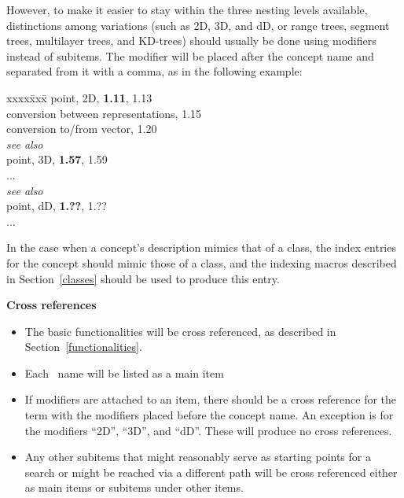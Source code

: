 \documentclass{article}
\newenvironment{indexex}{\begin{tabbing}
xxxx\=xxx\=\kill}{\end{tabbing}}
\begin{document}
\begin{description}
        However,
        to make it easier to stay within the three nesting levels available, 
        distinctions among variations (such as
        2D, 3D, and dD, or range trees, segment trees, multilayer trees, 
        and KD-trees) should usually be done using 
        modifiers instead of subitems.  The modifier will be 
        placed after the concept name and separated from it with a comma, as in 
        the following example:
        \begin{indexex}
        point, 2D,                                  {\bf 1.11}, 1.13 \\
        \>  conversion between representations,                  1.15 \\
        \>  conversion to/from vector,                           1.20\\
        \>  {\em see also}                 \\
        point, 3D,                                  {\bf 1.57}, 1.59 \\
        \> ...                                                       \\
        \> {\em see also} \\
        point, dD,                                  {\bf 1.??}, 1.?? \\
        \> ...                                                       \\
        \end{indexex}

        In the case when a concept's description mimics that of a class,
        the index entries for the concept should mimic those of a class, and 
        the indexing macros described in Section~\ref{classes} should be used
        to produce this entry.

   \item{\bf Cross references}

        \begin{itemize}
           \item The basic functionalities will be cross referenced, as 
                 described in Section~\ref{functionalities}.  
           \item Each \CC\ name will be listed as a main item
           \item If modifiers are attached to an item, there should
                 be a cross reference for the term with the modifiers placed
                 before the concept name.   An exception is 
                 for the modifiers ``2D'', ``3D'', and ``dD''.  These will 
                 produce no cross references.
           \item Any other subitems that might reasonably serve as starting 
                 points 
                 for a search or might be reached via a different path will
                 be cross referenced either as main items or subitems under
                 other items.
        \end{itemize}


\end{description}
\end{document}
